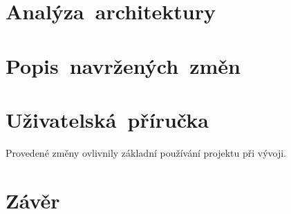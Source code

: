 \documentclass[12pt, a4paper]{article}
\begin{document}
\section{Analýza~architektury} %


\section{Popis~navržených~změn} %


\section{Uživatelská~příručka} %

Provedené změny ovlivnily základní používání projektu při vývoji.


\newpage
\section{Závěr}  %
\end{document}
